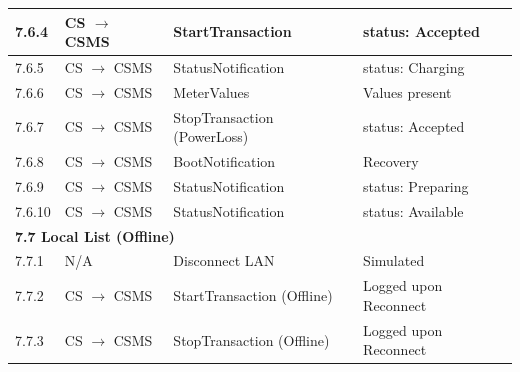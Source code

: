 \documentclass[a4paper,11pt]{report}
\begin{document}
\begin{footnotesize}
\begin{longtable}{|p{1.2cm}|p{2.5cm}|p{5.5cm}|p{6cm}|}
\hline
7.6.4 & CS $\to$ CSMS & StartTransaction & status: Accepted \\
\hline
7.6.5 & CS $\to$ CSMS & StatusNotification & status: Charging \\
\hline
7.6.6 & CS $\to$ CSMS & MeterValues & Values present \\
\hline
7.6.7 & CS $\to$ CSMS & StopTransaction (PowerLoss) & status: Accepted \\
\hline
7.6.8 & CS $\to$ CSMS & BootNotification & Recovery \\
\hline
7.6.9 & CS $\to$ CSMS & StatusNotification & status: Preparing \\
\hline
7.6.10 & CS $\to$ CSMS & StatusNotification & status: Available \\
\hline
\multicolumn{4}{|l|}{\textbf{7.7 Local List (Offline)}} \\
\hline
7.7.1 & N/A & Disconnect LAN & Simulated \\
\hline
7.7.2 & CS $\to$ CSMS & StartTransaction (Offline) & Logged upon Reconnect \\
\hline
7.7.3 & CS $\to$ CSMS & StopTransaction (Offline) & Logged upon Reconnect \\
\hline


\end{longtable}
\end{footnotesize}
\end{document}
